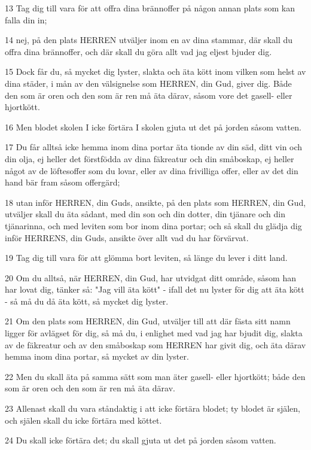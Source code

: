 \par 13 Tag dig till vara för att offra dina brännoffer på någon annan plats som kan falla din in;
\par 14 nej, på den plats HERREN utväljer inom en av dina stammar, där skall du offra dina brännoffer, och där skall du göra allt vad jag eljest bjuder dig.
\par 15 Dock får du, så mycket dig lyster, slakta och äta kött inom vilken som helst av dina städer, i mån av den välsignelse som HERREN, din Gud, giver dig. Både den som är oren och den som är ren må äta därav, såsom vore det gasell- eller hjortkött.
\par 16 Men blodet skolen I icke förtära I skolen gjuta ut det på jorden såsom vatten.
\par 17 Du får alltså icke hemma inom dina portar äta tionde av din säd, ditt vin och din olja, ej heller det förstfödda av dina fäkreatur och din småboskap, ej heller något av de löftesoffer som du lovar, eller av dina frivilliga offer, eller av det din hand bär fram såsom offergärd;
\par 18 utan inför HERREN, din Guds, ansikte, på den plats som HERREN, din Gud, utväljer skall du äta sådant, med din son och din dotter, din tjänare och din tjänarinna, och med leviten som bor inom dina portar; och så skall du glädja dig inför HERRENS, din Guds, ansikte över allt vad du har förvärvat.
\par 19 Tag dig till vara för att glömma bort leviten, så länge du lever i ditt land.
\par 20 Om du alltså, när HERREN, din Gud, har utvidgat ditt område, såsom han har lovat dig, tänker så: "Jag vill äta kött" - ifall det nu lyster för dig att äta kött - så må du då äta kött, så mycket dig lyster.
\par 21 Om den plats som HERREN, din Gud, utväljer till att där fästa sitt namn ligger för avlägset för dig, så må du, i enlighet med vad jag har bjudit dig, slakta av de fäkreatur och av den småboskap som HERREN har givit dig, och äta därav hemma inom dina portar, så mycket av din lyster.
\par 22 Men du skall äta på samma sätt som man äter gasell- eller hjortkött; både den som är oren och den som är ren må äta därav.
\par 23 Allenast skall du vara ståndaktig i att icke förtära blodet; ty blodet är själen, och själen skall du icke förtära med köttet.
\par 24 Du skall icke förtära det; du skall gjuta ut det på jorden såsom vatten.
